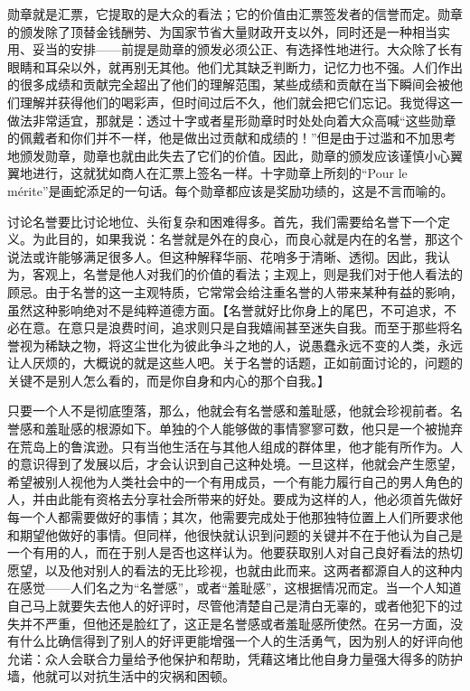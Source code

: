 \documentclass[12pt,oneside]{book}
\begin{document}
勋章就是汇票，它提取的是大众的看法；它的价值由汇票签发者的信誉而定。勋章的颁发除了顶替金钱酬劳、为国家节省大量财政开支以外，同时还是一种相当实用、妥当的安排——前提是勋章的颁发必须公正、有选择性地进行。大众除了长有眼睛和耳朵以外，就再别无其他。他们尤其缺乏判断力，记忆力也不强。人们作出的很多成绩和贡献完全超出了他们的理解范围，某些成绩和贡献在当下瞬间会被他们理解并获得他们的喝彩声，但时间过后不久，他们就会把它们忘记。我觉得这一做法非常适宜，那就是：透过十字或者星形勋章时时处处向着大众高喊“这些勋章的佩戴者和你们并不一样，他是做出过贡献和成绩的！”但是由于过滥和不加思考地颁发勋章，勋章也就由此失去了它们的价值。因此，勋章的颁发应该谨慎小心翼翼地进行，这就犹如商人在汇票上签名一样。十字勋章上所刻的“Pour le mérite”是画蛇添足的一句话。每个勋章都应该是奖励功绩的，这是不言而喻的。 

讨论名誉要比讨论地位、头衔复杂和困难得多。首先，我们需要给名誉下一个定义。为此目的，如果我说：名誉就是外在的良心，而良心就是内在的名誉，那这个说法或许能够满足很多人。但这种解释华丽、花哨多于清晰、透彻。因此，我认为，客观上，名誉是他人对我们的价值的看法；主观上，则是我们对于他人看法的顾忌。由于名誉的这一主观特质，它常常会给注重名誉的人带来某种有益的影响，虽然这种影响绝对不是纯粹道德方面。【名誉就好比你身上的尾巴，不可追求，不必在意。在意只是浪费时间，追求则只是自我嬉闹甚至迷失自我。而至于那些将名誉视为稀缺之物，将这尘世化为彼此争斗之地的人，说愚蠢永远不变的人类，永远让人厌烦的，大概说的就是这些人吧。关于名誉的话题，正如前面讨论的，问题的关键不是别人怎么看的，而是你自身和内心的那个自我。】 

只要一个人不是彻底堕落，那么，他就会有名誉感和羞耻感，他就会珍视前者。名誉感和羞耻感的根源如下。单独的个人能够做的事情寥寥可数，他只是一个被抛弃在荒岛上的鲁滨逊。只有当他生活在与其他人组成的群体里，他才能有所作为。人的意识得到了发展以后，才会认识到自己这种处境。一旦这样，他就会产生愿望，希望被别人视他为人类社会中的一个有用成员，一个有能力履行自己的男人角色的人，并由此能有资格去分享社会所带来的好处。要成为这样的人，他必须首先做好每一个人都需要做好的事情；其次，他需要完成处于他那独特位置上人们所要求他和期望他做好的事情。但同样，他很快就认识到问题的关键并不在于他认为自己是一个有用的人，而在于别人是否也这样认为。他要获取别人对自己良好看法的热切愿望，以及他对别人的看法的无比珍视，也就由此而来。这两者都源自人的这种内在感觉——人们名之为“名誉感”，或者“羞耻感”，这根据情况而定。当一个人知道自己马上就要失去他人的好评时，尽管他清楚自己是清白无辜的，或者他犯下的过失并不严重，但他还是脸红了，这正是名誉感或者羞耻感所使然。在另一方面，没有什么比确信得到了别人的好评更能增强一个人的生活勇气，因为别人的好评向他允诺：众人会联合力量给予他保护和帮助，凭藉这堵比他自身力量强大得多的防护墙，他就可以对抗生活中的灾祸和困顿。 
\end{document}

